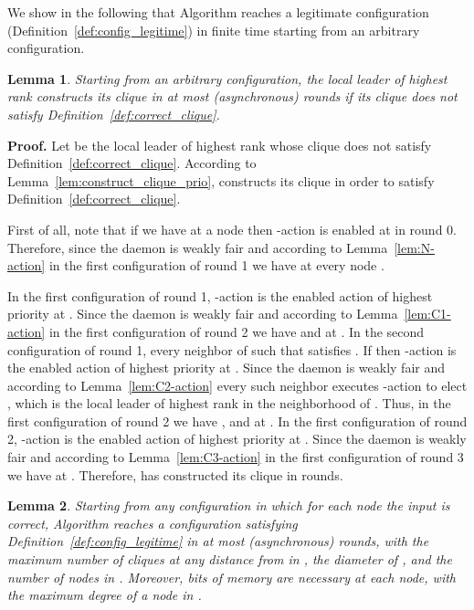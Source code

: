 \documentclass[11pt,letterpaper,onecolumn]{article}
\newtheorem{lemma}{Lemma}
\newenvironment{proof}{\noindent \begin{rm}{\textbf{Proof.} }}{\hspace*{\fill}\par\end{rm} \vspace{.3cm}}
\begin{document}
We show in the following that Algorithm  reaches a legitimate configuration (Definition~\ref{def:config_legitime}) in finite time starting from an arbitrary configuration.

\begin{lemma}
\label{lem:correct_clique_round}
Starting from an arbitrary configuration, the local leader of highest rank constructs its clique in at most  (asynchronous) rounds if its clique does not satisfy Definition~\ref{def:correct_clique}.
\end{lemma}

\begin{proof}
Let  be the local leader of highest rank whose clique  does not satisfy Definition~\ref{def:correct_clique}. According to Lemma~\ref{lem:construct_clique_prio},  constructs its clique  in order to satisfy Definition~\ref{def:correct_clique}.

First of all, note that if we have  at a node  then -action is enabled at  in round 0. Therefore, since the daemon is weakly fair and according to Lemma~\ref{lem:N-action} in the first configuration of round 1 we have  at every node .

In the first configuration of round 1, -action is the enabled action of highest priority at . Since the daemon is weakly fair and according to Lemma~\ref{lem:C1-action} in the first configuration of round 2 we have  and  at . In the second configuration of round 1, every neighbor  of  such that  satisfies . If  then -action is the enabled action of highest priority at . Since the daemon is weakly fair and according to Lemma~\ref{lem:C2-action} every such neighbor  executes -action to elect , which is the local leader of highest rank in the neighborhood of . Thus, in the first configuration of round 2 we have , and  at . In the first configuration of round 2, -action is the enabled action of highest priority at . Since the daemon is weakly fair and according to Lemma~\ref{lem:C3-action} in the first configuration of round 3 we have  at . Therefore,  has constructed its clique  in  rounds.
\end{proof}

\begin{lemma}
\label{lem:config_legitime_round}
Starting from any configuration in which for each node  the input  is correct, Algorithm  reaches a configuration satisfying Definition~\ref{def:config_legitime} in at most  (asynchronous) rounds, with  the maximum number of cliques at any distance from  in ,  the diameter of , and  the number of nodes in . Moreover,  bits of memory are necessary at each node, with  the maximum degree of a node in .
\end{lemma}
\end{document}
